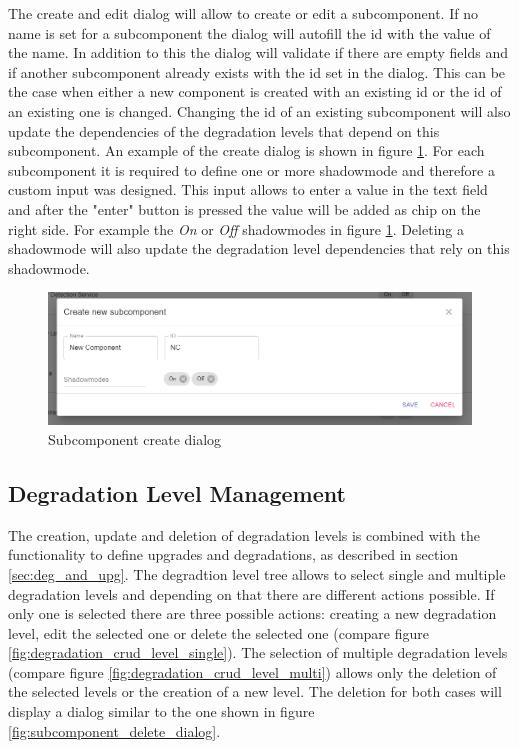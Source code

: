 The create and edit dialog will allow to create or edit a subcomponent. If no name is set for a subcomponent the dialog will autofill the id with the value of the name. In addition to this the dialog will validate if there are empty fields and if another subcomponent already exists with the id set in the dialog. This can be the case when either a new component is created with an existing id or the id of an existing one is changed. Changing the id of an existing subcomponent will also update the dependencies of the degradation levels that depend on this subcomponent. An example of the create dialog is shown in figure \ref{fig:subcomponent_create_dialog}. For each subcomponent it is required to define one or more shadowmode and therefore a custom input was designed. This input allows to enter a value in the text field and after the "enter" button is pressed the value will be added as chip on the right side. For example the \textit{On} or \textit{Off} shadowmodes in figure \ref{fig:subcomponent_create_dialog}. Deleting a shadowmode will also update the degradation level dependencies that rely on this shadowmode.

\begin{figure}[ht]
    \centering
    \includegraphics[width=\textwidth]{img/subcomponents_create.png}
    \caption{Subcomponent create dialog}
    \label{fig:subcomponent_create_dialog}
\end{figure}

\subsection{Degradation Level Management}
The creation, update and deletion of degradation levels is combined with the functionality to define upgrades and degradations, as described in section \ref{sec:deg_and_upg}. The degradtion level tree allows to select single and multiple degradation levels and depending on that there are different actions possible. If only one is selected there are three possible actions: creating a new degradation level, edit the selected one or delete the selected one (compare figure \ref{fig:degradation_crud_level_single}). The selection of multiple degradation levels (compare figure \ref{fig:degradation_crud_level_multi}) allows only the deletion of the selected levels or the creation of a new level. The deletion for both cases will display a dialog similar to the one shown in figure \ref{fig:subcomponent_delete_dialog}.

